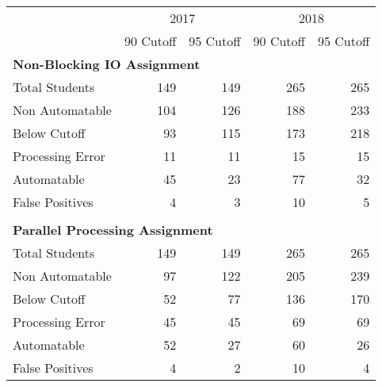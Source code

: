 \begin{tabular}{lrrrr} \toprule
& \multicolumn{2}{c}{2017} & \multicolumn{2}{c}{2018} \\
& 90 Cutoff & 95 Cutoff & 90 Cutoff & 95 Cutoff \\
\midrule
\multicolumn{5}{l}{ \textbf{Non-Blocking IO Assignment} }\\
\tspace Total Students           &   149 &   149 &   265 &   265 \\
\tspace Non Automatable          &   104 &   126 &   188 &   233 \\
\tspace \tspace Below Cutoff     &    93 &   115 &   173 &   218 \\
\tspace \tspace Processing Error &    11 &    11 &    15 &    15 \\
\tspace Automatable              &    45 &    23 &    77 &    32 \\
\tspace \tspace False Positives  &     4 &     3 &    10 &     5 \\
\\
\multicolumn{5}{l}{ \textbf{Parallel Processing Assignment} }\\
\tspace Total Students           &   149 &   149 &   265 &   265 \\
\tspace Non Automatable          &    97 &   122 &   205 &   239 \\
\tspace \tspace Below Cutoff     &    52 &    77 &   136 &   170 \\
\tspace \tspace Processing Error &    45 &    45 &    69 &    69 \\
\tspace Automatable              &    52 &    27 &    60 &    26 \\
\tspace \tspace False Positives  &     4 &     2 &    10 &     4 \\
\bottomrule
\end{tabular}
